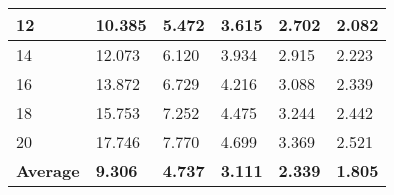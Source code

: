 \begin{table}[t!]
\begin{tabular}{|p{1.10cm}|p{0.95cm}|p{0.95cm}|p{0.95cm}|p{0.95cm}|p{0.95cm}|}
		12               & 10.385                                                                   & 5.472                                                                    & 3.615                                                                     & 2.702                                                                     & 2.082                                                                     \\ \hline
		14               & 12.073                                                                   & 6.120                                                                    & 3.934                                                                     & 2.915                                                                     & 2.223                                                                     \\ \hline
		16               & 13.872                                                                   & 6.729                                                                    & 4.216                                                                     & 3.088                                                                     & 2.339                                                                     \\ \hline
		18               & 15.753                                                                   & 7.252                                                                    & 4.475                                                                     & 3.244                                                                     & 2.442                                                                     \\ \hline
		20               & 17.746                                                                   & 7.770                                                                    & 4.699                                                                     & 3.369                                                                     & 2.521                                                                     \\ \hline
		\textbf{Average} & \textbf{9.306}                                                           & \textbf{4.737}                                                           & \textbf{3.111}                                                            & \textbf{2.339}                                                            & \textbf{1.805}                                                            \\ \hline
	\end{tabular}
	\label{tab:coverage}
\end{table}
